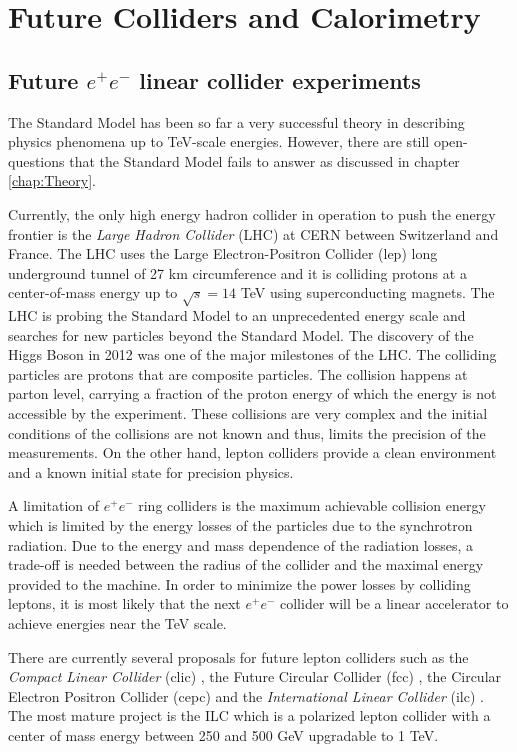 \part{Future Colliders and Calorimetry}

\chapter{Future $e^+e^-$ linear collider experiments}
\label{chap:FutureColliders}

The Standard Model has been so far a very successful theory in describing physics phenomena up to TeV-scale energies. However, there are still open-questions that the Standard Model fails to answer as discussed in chapter \ref{chap:Theory}.

Currently, the only high energy hadron collider in operation to push the energy frontier is the \textit{Large Hadron Collider} (LHC) at CERN between Switzerland and France. The LHC uses the Large Electron-Positron Collider (\acrshort{lep}) long underground tunnel of 27 km circumference and it is colliding protons at a center-of-mass energy up to $\sqrt{s} = 14$ TeV using superconducting magnets. The LHC is probing the Standard Model to an unprecedented energy scale and searches for new particles beyond the Standard Model. The discovery of the Higgs Boson in 2012 \cite{Aad:2012tfa, Chatrchyan:2012xdj} was one of the major milestones of the LHC. The colliding particles are protons that are composite particles. The collision happens at parton level, carrying a fraction of the proton energy of which the energy is not accessible by the experiment. These collisions are very complex and the initial conditions of the collisions are not known and thus, limits the precision of the measurements. On the other hand, lepton colliders provide a clean environment and a known initial state for precision physics.

A limitation of $e^+e^-$ ring colliders is the maximum achievable collision energy which is limited by the energy losses of the particles due to the synchrotron radiation. Due to the energy and mass dependence of the radiation losses, a trade-off is needed between the radius of the collider and the maximal energy provided to the machine. In order to minimize the power losses by colliding leptons, it is most likely that the next $e^+e^-$ collider will be a linear accelerator to achieve energies near the TeV scale.

There are currently several proposals for future lepton colliders such as the \textit{Compact Linear Collider} (\acrshort{clic}) \cite{CLIC_CDR}, the Future Circular Collider (\acrshort{fcc}) \cite{Benedikt:2015kqj}, the Circular Electron Positron Collider (\acrshort{cepc}) \cite{CEPC-SPPCStudyGroup:2015csa, CEPC-SPPCStudyGroup:2015esa} and the \textit{International Linear Collider} (\acrshort{ilc}) \cite{ILC_TDR_Vol1}. The most mature project is the ILC which is a polarized lepton collider with a center of mass energy between 250 and 500 GeV upgradable to 1 TeV.

